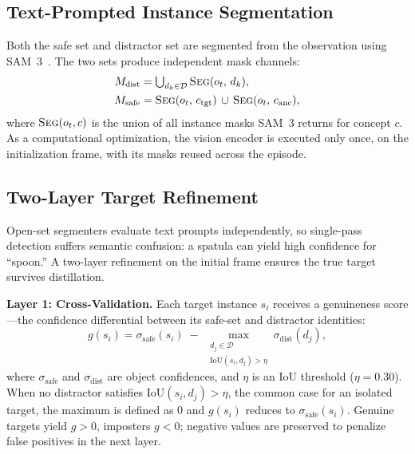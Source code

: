 \documentclass[letterpaper, 10 pt, conference]{ieeeconf}  %
\begin{document}
\subsection{Text-Prompted Instance Segmentation}
\label{sec:segmentation}
Both the safe set and distractor set are segmented from the observation using SAM~3~\cite{sam3}. The two sets produce independent mask channels:
\begin{align}
    M_{\text{dist}} &= \textstyle\bigcup_{d_k \in \mathcal{D}} \textsc{Seg}(o_t,\, d_k), \label{eq:distractor_mask} \\
    M_{\text{safe}} &= \textsc{Seg}(o_t,\, c_{\text{tgt}}) \,\cup\, \textsc{Seg}(o_t,\, c_{\text{anc}}), \label{eq:safe_mask}
\end{align}
where $\textsc{Seg}(o_t, c)$ is the union of all instance masks SAM~3 returns for concept $c$. As a computational optimization, the vision encoder is executed only once, on the initialization frame, with its masks reused across the episode.

\subsection{Two-Layer Target Refinement}
\label{sec:refinement}
Open-set segmenters evaluate text prompts independently, so single-pass detection suffers semantic confusion: a spatula can yield high confidence for ``spoon.'' A two-layer refinement on the initial frame ensures the true target survives distillation.

\textbf{Layer 1: Cross-Validation.} Each target instance $s_i$ receives a genuineness score---the confidence differential between its safe-set and distractor identities:
\begin{equation}
    g(s_i) = \sigma_{\text{safe}}(s_i) \;-\; \max_{\substack{d_j \in \mathcal{D} \\ \text{IoU}(s_i, d_j) > \eta}} \sigma_{\text{dist}}(d_j),
    \label{eq:genuineness}
\end{equation}
where $\sigma_{\text{safe}}$ and $\sigma_{\text{dist}}$ are object confidences, and $\eta$ is an IoU threshold ($\eta = 0.30$). When no distractor satisfies $\text{IoU}(s_i, d_j) > \eta$, the common case for an isolated target, the maximum is defined as $0$ and $g(s_i)$ reduces to $\sigma_{\text{safe}}(s_i)$. Genuine targets yield $g > 0$, imposters $g < 0$; negative values are preserved to penalize false positives in the next layer.
\end{document}
